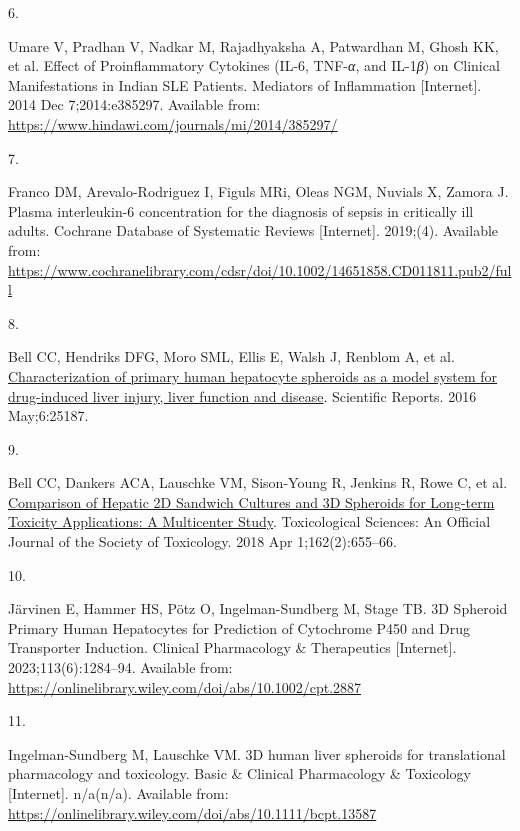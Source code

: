 \documentclass[
  letterpaper,
  DIV=11,
  numbers=noendperiod,
  oneside]{scrartcl}
\newlength{\cslhangindent}
\newlength{\csllabelwidth}
\newenvironment{CSLReferences}[2] %
 {\begin{list}{}{%
  \setlength{\itemindent}{0pt}
  \setlength{\leftmargin}{0pt}
  \setlength{\parsep}{0pt}
  \ifodd #1
   \setlength{\leftmargin}{\cslhangindent}
   \setlength{\itemindent}{-1\cslhangindent}
  \fi
  \setlength{\itemsep}{#2\baselineskip}}}
 {\end{list}}
\newcommand{\CSLLeftMargin}[1]{\parbox[t]{\csllabelwidth}{\strut#1\strut}}
\newcommand{\CSLRightInline}[1]{\parbox[t]{\linewidth - \csllabelwidth}{\strut#1\strut}}
\begin{document}
\begin{CSLReferences}{0}{1}
\CSLLeftMargin{6. }%
\CSLRightInline{Umare V, Pradhan V, Nadkar M, Rajadhyaksha A, Patwardhan
M, Ghosh KK, et al. Effect of Proinflammatory Cytokines (IL-6,
TNF-{\emph{α}}, and IL-1{\emph{β}}) on Clinical Manifestations in Indian
SLE Patients. Mediators of Inflammation {[}Internet{]}. 2014 Dec
7;2014:e385297. Available from:
\url{https://www.hindawi.com/journals/mi/2014/385297/}}

\CSLLeftMargin{7. }%
\CSLRightInline{Franco DM, Arevalo-Rodriguez I, Figuls MRi, Oleas NGM,
Nuvials X, Zamora J. Plasma interleukin{-}6 concentration for the
diagnosis of sepsis in critically ill adults. Cochrane Database of
Systematic Reviews {[}Internet{]}. 2019;(4). Available from:
\url{https://www.cochranelibrary.com/cdsr/doi/10.1002/14651858.CD011811.pub2/full}}

\CSLLeftMargin{8. }%
\CSLRightInline{Bell CC, Hendriks DFG, Moro SML, Ellis E, Walsh J,
Renblom A, et al.
\href{https://doi.org/10.1038/srep25187}{Characterization of primary
human hepatocyte spheroids as a model system for drug-induced liver
injury, liver function and disease}. Scientific Reports. 2016
May;6:25187. }

\CSLLeftMargin{9. }%
\CSLRightInline{Bell CC, Dankers ACA, Lauschke VM, Sison-Young R,
Jenkins R, Rowe C, et al.
\href{https://doi.org/10.1093/toxsci/kfx289}{Comparison of Hepatic 2D
Sandwich Cultures and 3D Spheroids for Long-term Toxicity Applications:
A Multicenter Study}. Toxicological Sciences: An Official Journal of the
Society of Toxicology. 2018 Apr 1;162(2):655--66. }

\CSLLeftMargin{10. }%
\CSLRightInline{Järvinen E, Hammer HS, Pötz O, Ingelman-Sundberg M,
Stage TB. 3D Spheroid Primary Human Hepatocytes for Prediction of
Cytochrome P450 and Drug Transporter Induction. Clinical Pharmacology \&
Therapeutics {[}Internet{]}. 2023;113(6):1284--94. Available from:
\url{https://onlinelibrary.wiley.com/doi/abs/10.1002/cpt.2887}}

\CSLLeftMargin{11. }%
\CSLRightInline{Ingelman-Sundberg M, Lauschke VM. 3D human liver
spheroids for translational pharmacology and toxicology. Basic \&
Clinical Pharmacology \& Toxicology {[}Internet{]}. n/a(n/a). Available
from: \url{https://onlinelibrary.wiley.com/doi/abs/10.1111/bcpt.13587}}


\end{CSLReferences}
\end{document}
